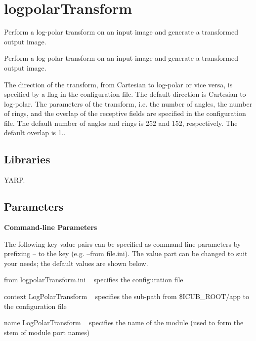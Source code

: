 \section{logpolar\+Transform}
\label{group__icub__logpolarTransform}


Perform a log-\/polar transform on an input image and generate a transformed output image.  


Perform a log-\/polar transform on an input image and generate a transformed output image. 

The direction of the transform, from Cartesian to log-\/polar or vice versa, is specified by a flag in the configuration file. The default direction is Cartesian to log-\/polar. The parameters of the transform, i.\+e. the number of angles, the number of rings, and the overlap of the receptive fields are specified in the configuration file. The default number of angles and rings is 252 and 152, respectively. The default overlap is 1..\hypertarget{group__icub__logpolarTransform_lib_sec}{}\subsection{Libraries}\label{group__icub__logpolarTransform_lib_sec}
Y\+A\+R\+P.\hypertarget{group__icub__logpolarTransform_parameters_sec}{}\subsection{Parameters}\label{group__icub__logpolarTransform_parameters_sec}
{\bfseries Command-\/line Parameters}

The following key-\/value pairs can be specified as command-\/line parameters by prefixing {\ttfamily --} to the key (e.\+g. {\ttfamily --from} file.\+ini). The value part can be changed to suit your needs; the default values are shown below.


\begin{DoxyItemize}
\item {\ttfamily from} {\ttfamily logpolar\+Transform.\+ini} ~\newline
 specifies the configuration file
\item {\ttfamily context} {\ttfamily Log\+Polar\+Transform} ~\newline
 specifies the sub-\/path from {\ttfamily \$\+I\+C\+U\+B\+\_\+\+R\+O\+O\+T/app} to the configuration file
\item {\ttfamily name} {\ttfamily Log\+Polar\+Transform} ~\newline
 specifies the name of the module (used to form the stem of module port names)
\end{DoxyItemize}


